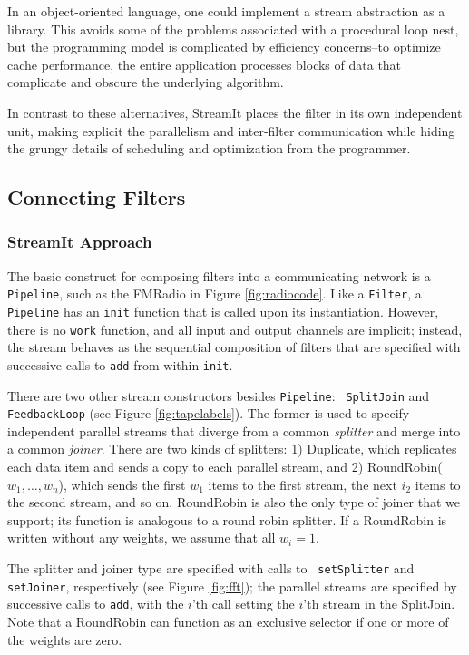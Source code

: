 In an object-oriented language, one could implement a stream
abstraction as a library.  This avoids some of the problems associated
with a procedural loop nest, but the programming model is complicated
by efficiency concerns--to optimize cache performance, the entire
application processes blocks of data that complicate and obscure the
underlying algorithm.

In contrast to these alternatives, StreamIt places the filter in its
own independent unit, making explicit the parallelism and inter-filter
communication while hiding the grungy details of scheduling and
optimization from the programmer.

\subsection{Connecting Filters}
\label{sec:connecting}

\subsubsection{StreamIt Approach}

The basic construct for composing filters into a communicating network
is a {\tt Pipeline}, such as the FMRadio in Figure
\ref{fig:radiocode}.  Like a {\tt Filter}, a {\tt Pipeline} has an
{\tt init} function that is called upon its instantiation.  However,
there is no {\tt work} function, and all input and output channels are
implicit; instead, the stream behaves as the sequential composition of
filters that are specified with successive calls to {\tt add} from
within {\tt init}.

There are two other stream constructors besides {\tt Pipeline}: {\tt
SplitJoin} and {\tt FeedbackLoop} (see Figure \ref{fig:tapelabels}).
The former is used to specify independent parallel streams that
diverge from a common {\it splitter} and merge into a common {\it
joiner}.  There are two kinds of splitters: 1) Duplicate, which
replicates each data item and sends a copy to each parallel stream,
and 2) RoundRobin($w_1, \dots, w_n$), which sends the first $w_1$
items to the first stream, the next $i_2$ items to the second stream,
and so on.  RoundRobin is also the only type of joiner that we
support; its function is analogous to a round robin splitter.  If a
RoundRobin is written without any weights, we assume that all $w_i =
1$.

The splitter and joiner type are specified with calls to {\tt
setSplitter} and {\tt setJoiner}, respectively (see Figure
\ref{fig:fft}); the parallel streams are specified by successive calls
to {\tt add}, with the $i$'th call setting the $i$'th stream in the
SplitJoin.  Note that a RoundRobin can function as an exclusive
selector if one or more of the weights are zero.

